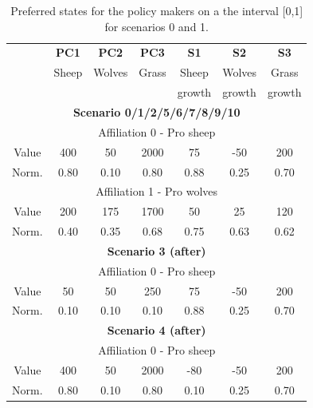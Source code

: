 \documentclass[12pt]{article}
\begin{document}
\begin{table}[h!]
\begin{center}
\begin{tabular}{ |c|c|c|c|c|c|c| } 
\hline

			& {\bfseries PC1}
					&  {\bfseries PC2}
							&  {\bfseries PC3}
									&  {\bfseries S1}	
											&  {\bfseries S2}	
													&  {\bfseries S3}  	\\ 
			& Sheep	& Wolves	& Grass	& Sheep	& Wolves	& Grass 	\\
			&		&		&		& growth	& growth	& growth	\\ \hline \hline \hline
\multicolumn{7}{|c|}{ {\bfseries Scenario 0/1/2/5/6/7/8/9/10}}				\\ \hline \hline	
\multicolumn{7}{|c|}{Affiliation 0 - Pro sheep}							\\ \hline 
Value		& 400	& 50		& 2000	& 75		& -50	& 200	\\ \hline
Norm.		& 0.80	& 0.10	& 0.80	& 0.88	& 0.25	& 0.70	\\ \hline
\multicolumn{7}{|c|}{Affiliation 1 - Pro wolves}							\\ \hline 
Value		& 200	& 175	& 1700	& 50		& 25		& 120	\\ \hline
Norm.		& 0.40	& 0.35	& 0.68	& 0.75	& 0.63	& 0.62	\\ \hline
\multicolumn{7}{|c|}{ {\bfseries Scenario 3 (after)}}						\\ \hline \hline	
\multicolumn{7}{|c|}{Affiliation 0 - Pro sheep}							\\ \hline 
Value		& 50	 	& 50		& 250	& 75		& -50	& 200	\\ \hline
Norm.		& 0.10	& 0.10	& 0.10	& 0.88	& 0.25	& 0.70	\\ \hline
\multicolumn{7}{|c|}{ {\bfseries Scenario 4 (after)}}						\\ \hline \hline	
\multicolumn{7}{|c|}{Affiliation 0 - Pro sheep}							\\ \hline 
Value		& 400	& 50		& 2000	& -80	& -50	& 200	\\ \hline
Norm.		& 0.80	& 0.10	& 0.80	& 0.10	& 0.25	& 0.70	\\ \hline

\end{tabular}
\end{center}
\caption{Preferred states for the policy makers on a the interval [0,1] for scenarios 0 and 1.}
\label{tab:preferredStates}
\end{table}
\end{document}
